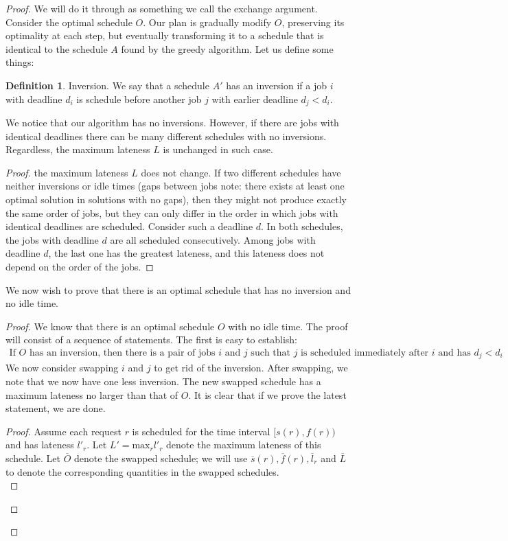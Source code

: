 \documentclass[a4paper]{article}
\theoremstyle{plain}
\theoremstyle{definition}
\newtheorem{defn}{Definition}[section]
\theoremstyle{remark}
\begin{document}
	\begin{proof}
		We will do it through as something we call the exchange argument. Consider the optimal schedule $O$. Our plan is gradually modify $O$, preserving its optimality at each step, but eventually transforming it to a schedule that is identical to the schedule $A$ found by the greedy algorithm. Let us define some things:
		\begin{defn}
			Inversion. We say that a schedule $A'$ has an inversion if a job $i$ with deadline $d_i$ is schedule before another job $j$ with earlier deadline $d_j<d_i$.
		\end{defn}
		We notice that our algorithm has no inversions. However, if there are jobs with identical deadlines there can be many different schedules with no inversions. Regardless, the maximum lateness $L$ is unchanged in such case.
		\begin{proof}
			the maximum lateness $L$ does not change. If two different schedules have neither inversions or idle times (gaps between jobs note: there exists at least one optimal solution in solutions with no gaps), then they might not produce exactly the same order of jobs, but they can only differ in the order in which jobs with identical deadlines are scheduled. Consider such a deadline $d$. In both schedules, the jobs with deadline $d$ are all scheduled consecutively. Among jobs with deadline $d$, the last one has the greatest lateness, and this lateness does not depend on the order of the jobs.
		\end{proof}
		We now wish to prove that there is an optimal schedule that has no inversion and no idle time.
		\begin{proof}
			We know that there is an optimal schedule $O$ with no idle time. The proof will consist of a sequence of statements. The first is easy to establish: \\
			\begin{align*}
				\text{If } O \text{ has an inversion, then there is a pair of jobs $i$ and $j$ such that $j$ is scheduled immediately after $i$ and has $d_j < d_i$}
			\end{align*}
			We now consider swapping $i$ and $j$ to get rid of the inversion. After swapping, we note that we now have one less inversion. The new swapped schedule has a maximum lateness no larger than that of $O$. It is clear that if we prove the latest statement, we are done.
			\begin{proof}
				Assume each request $r$ is scheduled for the time interval $[s(r),f(r))$ and has lateness $l'_r$. Let $L' = \text{max}_rl'_r$ denote the maximum lateness of this schedule. Let $\overline{O}$ denote the swapped schedule; we will use $\overline{s}(r), \overline{f}(r), \overline{l}_r$ and $\overline{L}$ to denote the corresponding quantities in the swapped schedules. \\

\end{proof}
\end{proof}
\end{proof}
\end{document}
